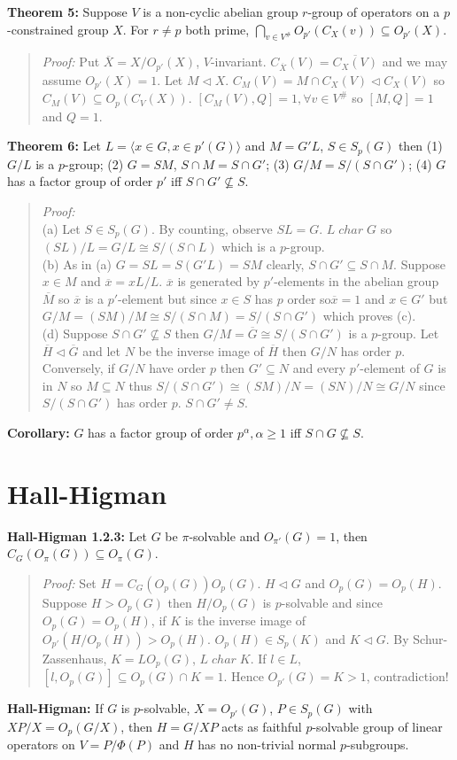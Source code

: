 {\bf Theorem 5:}
Suppose $V$ is a non-cyclic abelian group $r$-group of operators on a $p$-constrained
group $X$.  For $r \ne p$ both prime, 
$\bigcap_{v \in V^{\#}} O_{p'}(C_X(v)) \subseteq O_{p'}(X)$.
\begin{quote}
\emph{Proof:}
Put ${\overline X}= X/O_{p'}(X)$, $V$-invariant.
$C_{\overline X}(V)= {\overline {C_X(V)}}$ and we may assume $O_{p'}(X)=1$.
Let $M \lhd X$.
$C_M(V)= M \cap C_X(V) \lhd C_X(V)$ so  $C_M(V) \subseteq O_p(C_V(X))$.
$[C_M(V), Q]= 1, \forall v \in V^{\#}$ so $[M, Q] =1$ and $Q=1$.
\end{quote}
{\bf Theorem 6:}
Let $L= \langle x \in G, x \in p'(G) \rangle $ and $M=G'L$, $S \in S_p(G)$ then
(1) $G/L$ is a $p$-group; (2) $G=SM$, $S \cap M = S \cap G'$;
(3) $G/M= S/(S \cap G')$; (4) $G$ has a factor group of order
$p'$ iff $S \cap G' \nsubseteq S$.
\begin{quote}
\emph{Proof:}
\\
(a) Let $S \in S_p(G)$.  By counting, observe $SL=G$.  $L \; char \; G$ so
$(SL)/L= G/L \cong S/(S \cap L)$ which is a $p$-group.
\\
(b) As in (a) $G= SL = S(G'L) = SM$ clearly, $S \cap G' \subseteq S \cap M$.
Suppose $x \in M$ and ${\overline x} = xL/L$.  ${\overline x}$ is generated
by $p'$-elements in the abelian group ${\overline M}$ so ${\overline x}$ is
a $p'$-element but since $x \in S$ has $p$ order so${\overline x} =1$ and
$x \in G'$ but $G/M = (SM)/M \cong S/(S \cap M) = S/(S \cap G')$ which proves (c).
\\
(d) 
Suppose $S \cap G' \nsubseteq S$ then $G/M= {\overline G} \cong S/(S \cap G')$ is a 
$p$-group.  Let ${\overline H} \lhd {\overline G}$ and let $N$ be the inverse image
of ${\overline H}$ then $G/N$ has order $p$.  Conversely,
if $G/N$ have order $p$ then $G' \subseteq N$ and every $p'$-element of $G$ is in
$N$ so $M \subseteq N$ thus $S/(S \cap G') \cong (SM)/N = (SN)/N \cong G/N$
since $S/(S \cap G')$ has order $p$.
$S \cap G' \ne S$.
\end{quote}
{\bf Corollary:} $G$ has a factor group of order $p^{\alpha}, \alpha \ge 1$ iff
$S \cap G \nsubseteq S$.
\section {Hall-Higman}
{\bf Hall-Higman 1.2.3:}  
Let $G$ be $\pi$-solvable and $O_{\pi'}(G)=1$, then
$C_G(O_{\pi}(G)) \subseteq O_{\pi}(G)$.
\begin{quote}
\emph{Proof:}  
Set $H= C_G(O_p(G)) O_p(G)$.  $H \lhd G$ 
and $O_p(G)=O_p(H)$.
Suppose $H > O_p(G)$ then $H/O_p(G)$ is $p$-solvable 
and since $O_p(G)=O_p(H)$, if $K$ is the inverse image of $O_{p'}(H/O_p(H)) > O_p(H)$.
$O_p(H) \in S_p(K)$ and $K \lhd G$.
By Schur-Zassenhaus, $K=L O_p(G)$, $L \; char \; K$.  
If $l \in L$, $[l, O_p(G)] \subseteq O_p(G) \cap K =1$.  Hence $O_{p'}(G)= K >1$, contradiction!
\end{quote}
{\bf Hall-Higman:} If $G$ is $p$-solvable, $X= O_{p'}(G)$, $P \in S_p(G)$ with
$XP/X= O_p(G/X)$, then $H=G/XP$ acts as faithful $p$-solvable group of linear
operators on $V= P/\Phi(P)$ and $H$ has no non-trivial normal $p$-subgroups.
